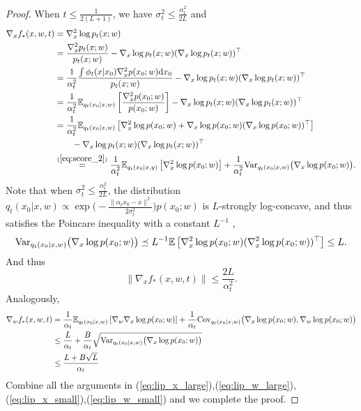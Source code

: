 \documentclass[11pt]{article}
\numberwithin{equation}{section}
\renewcommand{\eqref}[1]{(\ref{#1})}
\begin{document}
\begin{proof}
    When $t\leq\frac{1}{2(L+1)}$, we have $\sigma_t^2\leq \frac{\alpha_t^2}{2L}$ and
    \begin{equation}
        \begin{aligned}
            \nabla_xf_*(x,w,t)
            &=\nabla_x^2\log p_t(x;w) \\
            &= \frac{\nabla_x^2 p_t(x;w)}{p_t(x;w)} - \nabla_x\log p_t(x;w)(\nabla_x\log p_t(x;w))^\top \\
            &=\frac{1}{\alpha_t^2} \frac{\int \phi_t(x|x_0)\nabla_x^2p(x_0;w)\dif x_0}{p_t(x;w)} - \nabla_x\log p_t(x;w)(\nabla_x\log p_t(x;w))^\top \\
            &= \frac{1}{\alpha_t^2} \E_{q_t(x_0|x,w)}\left[\frac{\nabla_x^2p(x_0;w)}{p(x_0;w)}\right] - \nabla_x\log p_t(x;w)(\nabla_x\log p_t(x;w))^\top \\
            &= \frac{1}{\alpha_t^2} \E_{q_t(x_0|x,w)}\left[\nabla_x^2\log p(x_0;w)+\nabla_x\log p(x_0;w)(\nabla_x\log p(x_0;w))^\top\right] \\
            &\qquad - \nabla_x\log p_t(x;w)(\nabla_x\log p_t(x;w))^\top \\
            &\overset{\eqref{eq:score_2}}{=} \frac{1}{\alpha_t^2} \E_{q_t(x_0|x,y)}\left[\nabla_x^2\log p(x_0;w)\right] + \frac{1}{\alpha_t^2}\Var_{q_t(x_0|x,w)}\big(\nabla_x\log p(x_0;w)\big).
        \end{aligned}
    \end{equation}
    Note that when $\sigma_t^2\leq \frac{\alpha_t^2}{2L}$, the distribution $q_t(x_0|x,w)\propto \exp\big(-\frac{\|\alpha_tx_0-x\|^2}{2\sigma_t^2}\big)p(x_0;w)$ is $L$-strongly log-concave, and thus satisfies the Poincare inequality with a constant $L^{-1}$ \citep{chen2023improved},
    \begin{equation}
        \mathrm{Var}_{q_t(x_0|x,w)}\big(\nabla_x\log p(x_0;w)\big)\preceq L^{-1} \mathbb{E} \left[\nabla_x^2\log p(x_0;w) (\nabla_x^2\log p(x_0;w))^\top\right] \leq L.
    \end{equation}
    And thus
    \begin{equation}\label{eq:lip_x_small}
        \|\nabla_xf_*(x,w,t)\|\leq \frac{2L}{\alpha_t^2}.
    \end{equation}
    Analogously,
    \begin{equation}\label{eq:lip_w_small}
        \begin{aligned}
            \nabla_wf_*(x,w,t)
            &= \frac{1}{\alpha_t} \mathbb{E}_{q_t(x_0|x,w)}\left[\nabla_w\nabla_x\log p(x_0;w)\right] + \frac{1}{\alpha_t} \mathrm{Cov}_{q_t(x_0|x,w)}\big(\nabla_x\log p(x_0;w), \nabla_w\log p(x_0;w)\big) \\
            &\leq \frac{L}{\alpha_t} + \frac{B}{\alpha_t}\sqrt{\mathrm{Var}_{q_t(x_0|x,w)}\big(\nabla_x\log p(x_0;w)\big)} \\
            &\leq \frac{L+B\sqrt{L}}{\alpha_t}
        \end{aligned}
    \end{equation}
    Combine all the arguments in \eqref{eq:lip_x_large},\eqref{eq:lip_w_large},\eqref{eq:lip_x_small},\eqref{eq:lip_w_small} and we complete the proof.
\end{proof}
\end{document}
